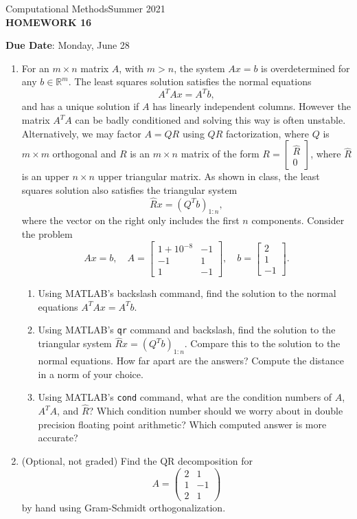 \documentclass[12pt]{article}
\begin{document}
\begin{center}
Computational Methods\qquad Summer 2021
\\

\textbf{\large HOMEWORK 16}\\
\end{center}
\noindent \textbf{Due Date}: Monday, June 28\\

\begin{enumerate}
\item For an $m\times n$ matrix $A$, with $m>n$, the system $Ax=b$ is overdetermined for any $b\in \mathbb{R}^m$. The least squares solution satisfies the normal equations
	\[A^T Ax = A^T b,\]
and has a unique solution if $A$ has linearly independent columns. However the matrix $A^T A$ can be badly conditioned and solving this way is often unstable. Alternatively, we may factor $A=QR$ using $QR$ factorization, where $Q$ is $m\times m$ orthogonal and $R$ is an $m\times n$ matrix of the form $R = \begin{bmatrix}\widehat{R}\\ 0\end{bmatrix}$, where $\widehat{R}$ is an upper $n\times n$ upper triangular matrix. As shown in class, the least squares solution also satisfies the triangular system 
	\[\widehat{R} x = (Q^T b)_{1:n},\]
where the vector on the right only includes the first $n$ components. Consider the problem
	\[Ax=b,\quad A=\begin{bmatrix}1+10^{-8} & -1\\ -1 & 1 \\ 1 & -1 \end{bmatrix},\quad b=\begin{bmatrix}2\\1\\-1\end{bmatrix}.\]
	\begin{enumerate}
	\item Using MATLAB's backslash command, find the solution to the normal equations $A^T Ax = A^T b$.
	\item Using MATLAB's \texttt{qr} command and backslash, find the solution to the triangular system $\widehat{R} x = (Q^T b)_{1:n}$. Compare this to the solution to the normal equations. How far apart are the answers?  Compute the distance in a norm of your choice.
	\item Using MATLAB's \texttt{cond} command, what are the condition numbers of $A$, $A^T A$, and $\widehat{R}$? Which condition number should we worry about in double precision floating point arithmetic? Which computed answer is more accurate? 
	\end{enumerate}
\item (Optional, not graded) Find the QR decomposition for 
	\[A=\begin{pmatrix}2&1\\1&-1\\2&1\end{pmatrix}\]
by hand using Gram-Schmidt orthogonalization. 


\end{enumerate}
\end{document}
